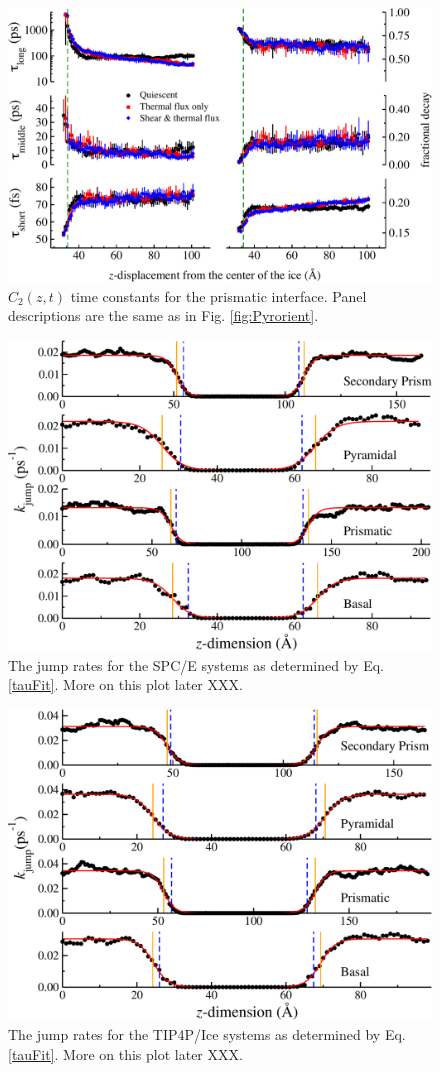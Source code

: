 \begin{figure}
\includegraphics[width=\linewidth]{Figures/Pri_lcorrz}
\caption{\label{fig:Porient} $C_2(z,t)$ time constants for the prismatic
  interface.  Panel descriptions are the same as in
  Fig. \ref{fig:Pyrorient}.}
\end{figure}

\begin{figure}
\includegraphics[width=\linewidth]{Figures/jumpRateStackedPlot2}
\caption{\label{fig:SPCEjumpRates} The jump rates for the SPC/E
  systems as determined by Eq. \eqref{tauFit}. More on this plot later
XXX. }
\end{figure}


\begin{figure}
\includegraphics[width=\linewidth]{Figures/TIP4PjumpStacked}
\caption{\label{fig:TIP4PIcejumpRates} The jump rates for the TIP4P/Ice
  systems as determined by Eq. \eqref{tauFit}. More on this plot later
XXX. }
\end{figure}